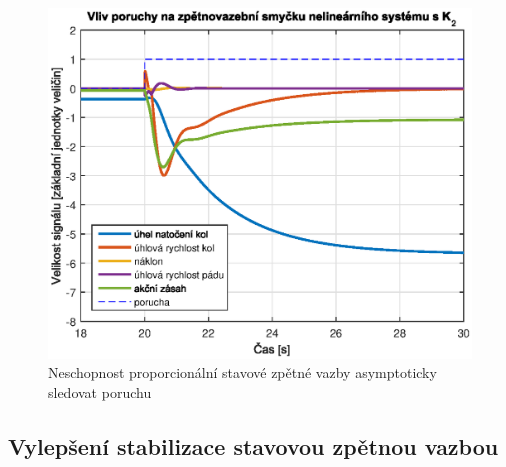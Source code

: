 \documentclass[conference]{IEEEtran}
\begin{document}
\begin{figure}[h!]
    \centerline{\includegraphics[width=\linewidth]{stavova_ZV_porucha.eps}}
    \caption{Neschopnost proporcionální stavové zpětné vazby asymptoticky sledovat poruchu}
    \label{fig:porucha_stavova_ZV}        
\end{figure}

\subsection{Vylepšení stabilizace stavovou zpětnou vazbou}
\end{document}

